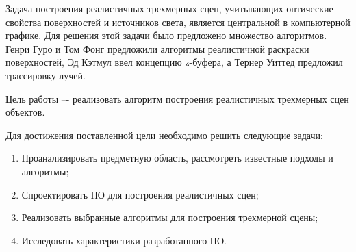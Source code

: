 
Задача построения реалистичных трехмерных сцен, учитывающих оптические свойства поверхностей и источников света, является центральной в компьютерной графике. Для решения этой задачи было предложено множество алгоритмов. Генри Гуро и Том Фонг предложили алгоритмы реалистичной раскраски поверхностей, Эд Кэтмул ввел концепцию z-буфера, а Тернер Уиттед предложил трассировку лучей.

Цель работы –- реализовать алгоритм построения реалистичных трехмерных сцен объектов.

Для достижения поставленной цели необходимо решить следующие задачи:
\begin{enumerate}
	\item Проанализировать предметную область, рассмотреть известные подходы и алгоритмы;
	\item Спроектировать ПО для построения реалистичных сцен;
	\item Реализовать выбранные алгоритмы для построения трехмерной сцены;
	\item Исследовать характеристики разработанного ПО.
\end{enumerate}

\clearpage
